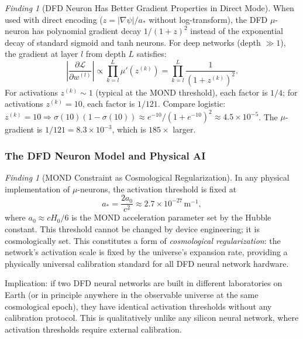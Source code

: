 \documentclass[11pt]{article}
\theoremstyle{definition}
\theoremstyle{remark}
\newtheorem{finding}[theorem]{Finding}
\newcommand{\astar}{a_*}
\newcommand{\mufn}{\mu}
\begin{document}
\begin{finding}[DFD Neuron Has Better Gradient Properties in Direct Mode]
\label{find:gradient_advantage}
When used with direct encoding ($z = |\nabla\psi|/\astar$ without
log-transform), the DFD $\mu$-neuron has polynomial gradient decay
$1/(1+z)^2$ instead of the exponential decay of standard sigmoid and tanh
neurons. For deep networks (depth $\gg 1$), the gradient at layer $l$
from depth $L$ satisfies:
\begin{equation}
\left|\frac{\partial \mathcal{L}}{\partial w^{(l)}}\right|
\propto \prod_{k=l}^{L} \mufn'(z^{(k)})
= \prod_{k=l}^{L} \frac{1}{(1+z^{(k)})^2}.
\label{eq:deep_gradient}
\end{equation}
For activations $z^{(k)} \sim 1$ (typical at the MOND threshold), each
factor is $1/4$; for activations $z^{(k)} = 10$, each factor is $1/121$.
Compare logistic: $z^{(k)} = 10 \Rightarrow \sigma(10)(1-\sigma(10))
\approx e^{-10}/(1+e^{-10})^2 \approx 4.5\times10^{-5}$. The $\mu$-gradient
is $1/121 = 8.3\times10^{-3}$, which is $185\times$ larger.
\end{finding}

\subsubsection{The DFD Neuron Model and Physical AI}

\begin{finding}[MOND Constraint as Cosmological Regularization]
\label{find:cosmo_reg}
In any physical implementation of $\mu$-neurons, the activation threshold
is fixed at
\begin{equation}
\astar = \frac{2a_0}{c^2} \approx 2.7\times10^{-27}\,\mathrm{m}^{-1},
\label{eq:astar_value}
\end{equation}
where $a_0 \approx cH_0/6$ is the MOND acceleration parameter set by
the Hubble constant. This threshold cannot be changed by device engineering;
it is cosmologically set. This constitutes a form of \emph{cosmological
regularization}: the network's activation scale is fixed by the universe's
expansion rate, providing a physically universal calibration standard for
all DFD neural network hardware.

Implication: if two DFD neural networks are built in different laboratories
on Earth (or in principle anywhere in the observable universe at the same
cosmological epoch), they have identical activation thresholds without any
calibration protocol. This is qualitatively unlike any silicon neural
network, where activation thresholds require external calibration.
\end{finding}
\end{document}
